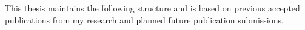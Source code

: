 This thesis maintains the following structure and is based on previous accepted publications from my research and planned future publication submissions.